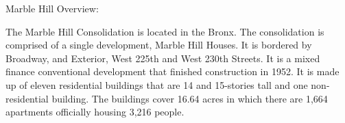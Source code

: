 Marble Hill Overview:  

   

The Marble Hill Consolidation is located in the Bronx. The consolidation is comprised of a single development, Marble Hill Houses. It is bordered by Broadway, and Exterior, West 225th and West 230th Streets. It is a mixed finance conventional development that finished construction in 1952. It is made up of eleven residential buildings that are 14 and 15-stories tall and one non-residential building. The buildings cover 16.64 acres in which there are 1,664 apartments officially housing 3,216 people.    
